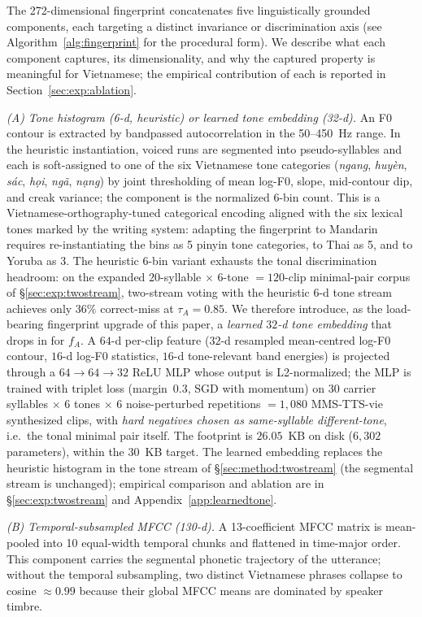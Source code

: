 \documentclass[a4paper,fleqn]{cas-dc}
\begin{document}
The 272-dimensional fingerprint concatenates five linguistically grounded components, each targeting a distinct invariance or discrimination axis (see Algorithm~\ref{alg:fingerprint} for the procedural form). We describe what each component captures, its dimensionality, and why the captured property is meaningful for Vietnamese; the empirical contribution of each is reported in Section~\ref{sec:exp:ablation}.

\emph{(A) Tone histogram (6-d, heuristic) or learned tone embedding (32-d).} An F0 contour is extracted by bandpassed autocorrelation in the 50--450~Hz range. In the heuristic instantiation, voiced runs are segmented into pseudo-syllables and each is soft-assigned to one of the six Vietnamese tone categories (\emph{ngang}, \emph{huy\`en}, \emph{s\'ac}, \emph{h\d{o}i}, \emph{ng\~a}, \emph{n\d{a}ng}) by joint thresholding of mean log-F0, slope, mid-contour dip, and creak variance; the component is the normalized 6-bin count. This is a Vietnamese-orthography-tuned categorical encoding aligned with the six lexical tones marked by the writing system: adapting the fingerprint to Mandarin requires re-instantiating the bins as 5 pinyin tone categories, to Thai as 5, and to Yoruba as 3. The heuristic 6-bin variant exhausts the tonal discrimination headroom: on the expanded $20$-syllable $\times$ $6$-tone $=120$-clip minimal-pair corpus of \S\ref{sec:exp:twostream}, two-stream voting with the heuristic 6-d tone stream achieves only $36\%$ correct-miss at $\tau_A=0.85$. We therefore introduce, as the load-bearing fingerprint upgrade of this paper, a \emph{learned $32$-d tone embedding} that drops in for $f_A$. A $64$-d per-clip feature ($32$-d resampled mean-centred log-F0 contour, $16$-d log-F0 statistics, $16$-d tone-relevant band energies) is projected through a $64 \to 64 \to 32$ ReLU MLP whose output is L2-normalized; the MLP is trained with triplet loss (margin~$0.3$, SGD with momentum) on $30$ carrier syllables $\times$ $6$ tones $\times$ $6$ noise-perturbed repetitions $=1{,}080$ MMS-TTS-vie synthesized clips, with \emph{hard negatives chosen as same-syllable different-tone}, i.e.\ the tonal minimal pair itself. The footprint is $26.05$~KB on disk ($6{,}302$ parameters), within the $30$~KB target. The learned embedding replaces the heuristic histogram in the tone stream of \S\ref{sec:method:twostream} (the segmental stream is unchanged); empirical comparison and ablation are in \S\ref{sec:exp:twostream} and Appendix~\ref{app:learnedtone}.

\emph{(B) Temporal-subsampled MFCC (130-d).} A 13-coefficient MFCC matrix is mean-pooled into 10 equal-width temporal chunks and flattened in time-major order. This component carries the segmental phonetic trajectory of the utterance; without the temporal subsampling, two distinct Vietnamese phrases collapse to cosine $\approx 0.99$ because their global MFCC means are dominated by speaker timbre.
\end{document}
